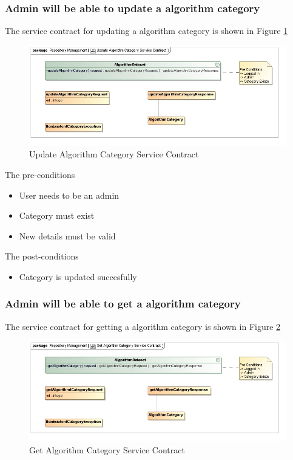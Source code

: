 \subsubsection {Admin will be able to update a algorithm category}

The service contract for updating a algorithm category is shown in Figure \ref{fig:updateAlgorithmCatService}
\begin{figure}[H]
  \begin{center}
  \includegraphics[scale=0.6]{../Diagrams and Charts/Test Data/Update Algorithm Category Service Contract.jpg}
  \caption{Update Algorithm Category Service Contract}
  \end{center}
  \label{fig:updateAlgorithmCatService}
\end{figure}


The pre-conditions
\begin{itemize}
  \item User needs to be an admin
  \item Category must exist
  \item New details must be valid
\end{itemize}

The post-conditions
\begin{itemize}
  \item Category is updated succesfully
\end{itemize}
\subsubsection {Admin will be able to get a algorithm category}

The service contract for getting a algorithm category is shown in Figure \ref{fig:getAlgorithmCatService}
\begin{figure}[H]
  \begin{center}
  \includegraphics[scale=0.6]{../Diagrams and Charts/Test Data/Get Algorithm Category Service Contract.jpg}
  \caption{Get Algorithm Category Service Contract}
  \end{center}
  \label{fig:getAlgorithmCatService}
\end{figure}

